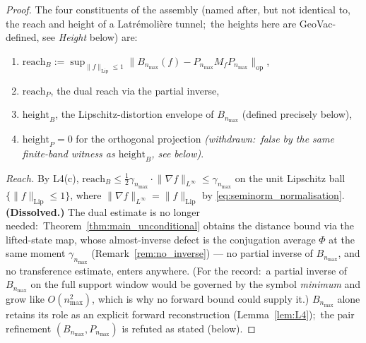 \documentclass[11pt,a4paper]{article}
\theoremstyle{plain}
\theoremstyle{definition}
\newcommand{\nmax}{n_{\max}}
\newcommand{\opnorm}[1]{\lVert #1 \rVert_{\mathrm{op}}}
\newcommand{\Lipnorm}[1]{\lVert #1 \rVert_{\mathrm{Lip}}}
\newcommand{\norm}[1]{\lVert #1 \rVert}
\newcommand{\Mat}{M}
\begin{document}
\begin{proof}
The four constituents of the assembly (named after, but not
identical to, the reach and height of a Latr\'emoli\`ere tunnel;\ the
heights here are GeoVac-defined, see \emph{Height} below) are:
\begin{enumerate}\setlength{\itemsep}{2pt}
\item $\mathrm{reach}_B
:= \sup_{\Lipnorm{f} \le 1}
\opnorm{B_{\nmax}(f) - P_{\nmax} \Mat_f P_{\nmax}}$,
\item $\mathrm{reach}_P$, the dual reach via the partial inverse,
\item $\mathrm{height}_B$, the Lipschitz-distortion envelope of
$B_{\nmax}$ (defined precisely below),
\item $\mathrm{height}_P = 0$ for the orthogonal projection
\emph{(withdrawn:\ false by the same finite-band witness as
$\mathrm{height}_B$, see below)}.
\end{enumerate}

\emph{Reach.} By L4(c), $\mathrm{reach}_B \le
\tfrac12\gamma_{\nmax}\cdot \norm{\nabla f}_{L^\infty} \le
\gamma_{\nmax}$ on the unit Lipschitz ball
$\{\Lipnorm{f} \le 1\}$, where $\norm{\nabla f}_{L^\infty} =
\Lipnorm{f}$ by \eqref{eq:seminorm_normalisation}.
\textbf{(Dissolved.)} The dual estimate is no longer needed:\
Theorem~\ref{thm:main_unconditional} obtains the distance bound via
the lifted-state map, whose almost-inverse defect is the conjugation
average $\Phi$ at the same moment $\gamma_{\nmax}$
(Remark~\ref{rem:no_inverse}) — no partial inverse of $B_{\nmax}$,
and no transference estimate, enters anywhere. (For the record:\ a
partial inverse of $B_{\nmax}$ on the full support window would be
governed by the symbol \emph{minimum} and grow like $O(\nmax^2)$,
which is why no forward bound could supply it.) $B_{\nmax}$ alone retains its role as an explicit forward
reconstruction (Lemma~\ref{lem:L4});\ the pair refinement
$(B_{\nmax}, P_{\nmax})$ is refuted as stated (below).


\end{proof}
\end{document}
